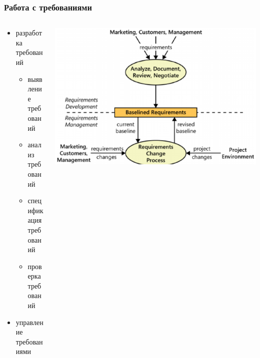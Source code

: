 \documentclass{../../slides-style}
\begin{document}
    \begin{frame}
        \frametitle{Работа с требованиями}
        \begin{columns}
            \begin{column}{0.4\textwidth}
                \begin{itemize}
                    \item разработка требований
                    \begin{itemize}
                        \item выявление требований
                        \item анализ требований
                        \item спецификация требований
                        \item проверка требований
                    \end{itemize}
                    \item управление требованиями
                \end{itemize}
            \end{column}
            \begin{column}{0.6\textwidth}
                \strut
                \includegraphics[width=\textwidth]{requirementsProcess.png}
            \end{column}
        \end{columns}
    \end{frame}
\end{document}
